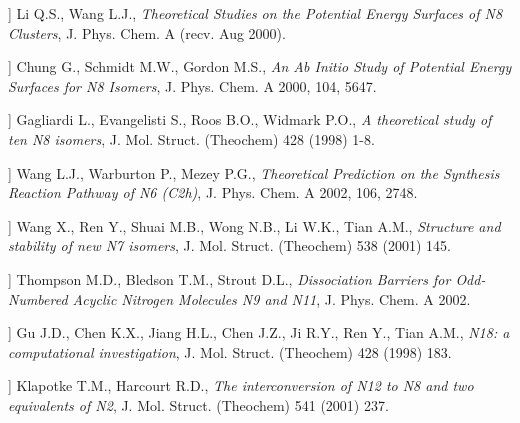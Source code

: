 \begin{description}[leftmargin=1.6cm,itemsep=3pt,style=nextline]
\item[[A13]] Li Q.S., Wang L.J., \emph{Theoretical Studies on the Potential Energy Surfaces of N8 Clusters}, J. Phys. Chem. A (recv. Aug 2000).
\item[[A14]] Chung G., Schmidt M.W., Gordon M.S., \emph{An Ab Initio Study of Potential Energy Surfaces for N8 Isomers}, J. Phys. Chem. A 2000, 104, 5647.
\item[[A15]] Gagliardi L., Evangelisti S., Roos B.O., Widmark P.O., \emph{A theoretical study of ten N8 isomers}, J. Mol. Struct. (Theochem) 428 (1998) 1-8.
\item[[A16]] Wang L.J., Warburton P., Mezey P.G., \emph{Theoretical Prediction on the Synthesis Reaction Pathway of N6 (C2h)}, J. Phys. Chem. A 2002, 106, 2748.
\item[[A17]] Wang X., Ren Y., Shuai M.B., Wong N.B., Li W.K., Tian A.M., \emph{Structure and stability of new N7 isomers}, J. Mol. Struct. (Theochem) 538 (2001) 145.
\item[[A18]] Thompson M.D., Bledson T.M., Strout D.L., \emph{Dissociation Barriers for Odd-Numbered Acyclic Nitrogen Molecules N9 and N11}, J. Phys. Chem. A 2002.
\item[[A19]] Gu J.D., Chen K.X., Jiang H.L., Chen J.Z., Ji R.Y., Ren Y., Tian A.M., \emph{N18: a computational investigation}, J. Mol. Struct. (Theochem) 428 (1998) 183.
\item[[A20]] Klapotke T.M., Harcourt R.D., \emph{The interconversion of N12 to N8 and two equivalents of N2}, J. Mol. Struct. (Theochem) 541 (2001) 237.
\end{description}
